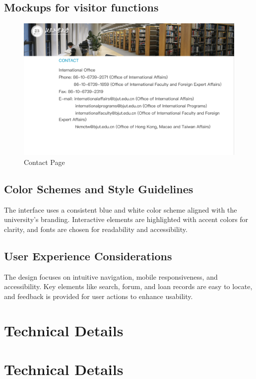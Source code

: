 \documentclass[12pt]{article}
\begin{document}
\subsection{Mockups for visitor functions}

\begin{figure}[H]
    \centering
    \includegraphics[width=\textwidth]{mockups/visitor/contact.png}
    \caption{Contact Page}
    \label{fig:visitor_contact_page}
\end{figure}

\subsection{Color Schemes and Style Guidelines}
The interface uses a consistent blue and white color scheme aligned with the university’s branding. Interactive elements are highlighted with accent colors for clarity, and fonts are chosen for readability and accessibility.

\subsection{User Experience Considerations}
The design focuses on intuitive navigation, mobile responsiveness, and accessibility. Key elements like search, forum, and loan records are easy to locate, and feedback is provided for user actions to enhance usability.

\newpage
\section{Technical Details}

\section{Technical Details}
\end{document}
